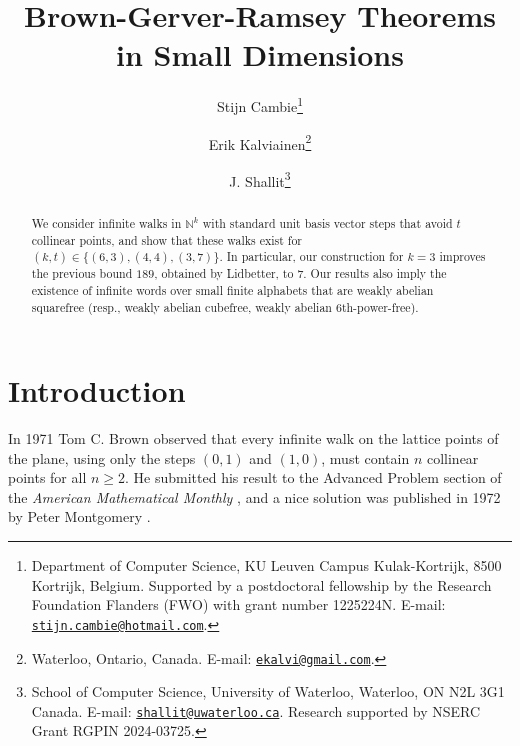 \documentclass[12pt,reqno]{article}
\newcommand{\N}{\mathbb N}
\begin{document}
\theoremstyle{plain}
\newtheorem{theorem}{Theorem}
\newtheorem{corollary}[theorem]{Corollary}
\newtheorem{lemma}[theorem]{Lemma}
\newtheorem{proposition}[theorem]{Proposition}

\theoremstyle{definition}
\newtheorem{definition}[theorem]{Definition}
\newtheorem{example}[theorem]{Example}
\newtheorem{conjecture}[theorem]{Conjecture}

\theoremstyle{remark}
\newtheorem{remark}[theorem]{Remark}

\author{Stijn Cambie\thanks{Department of Computer Science, KU Leuven Campus Kulak-Kortrijk, 8500 Kortrijk, Belgium. Supported by a postdoctoral fellowship by the Research Foundation Flanders (FWO) with grant number 1225224N. E-mail: \href{mailto:stijn.cambie@hotmail.com}{\tt stijn.cambie@hotmail.com}.} \and Erik Kalviainen\thanks{Waterloo, Ontario, Canada. E-mail: \href{mailto:ekalvi@gmail.com}{\tt ekalvi@gmail.com}.}  \and J. Shallit\thanks{
School of Computer Science,
University of Waterloo,
Waterloo, ON  N2L 3G1 
Canada. E-mail: 
\href{mailto:shallit@uwaterloo.ca}{\tt shallit@uwaterloo.ca}. Research supported by NSERC Grant RGPIN 2024-03725.}}

\title{Brown-Gerver-Ramsey Theorems in Small Dimensions}

\maketitle

\begin{abstract}
We consider infinite walks in $\N^k$ with standard unit basis vector steps that avoid
$t$ collinear points, and show that these walks exist for $(k,t) \in \{(6,3), (4,4), (3,7)\}$.  In particular, our construction for $k = 3$ improves the previous bound $189$, obtained by Lidbetter, to $7$.  Our results also imply the existence of infinite words over small finite alphabets that are weakly abelian squarefree (resp., weakly abelian cubefree, weakly abelian 6th-power-free).
\end{abstract}

\section{Introduction}

In 1971 Tom C. Brown observed that every infinite walk on the lattice points of the plane, using only the steps $(0,1)$ and $(1,0)$, must contain $n$ collinear points for all $n \geq 2$.  He submitted his result to the Advanced Problem section of the {\it American Mathematical Monthly} \cite{Bro71b}, and a nice solution was published in 1972 by Peter Montgomery \cite{Mo72}.
\end{document}
